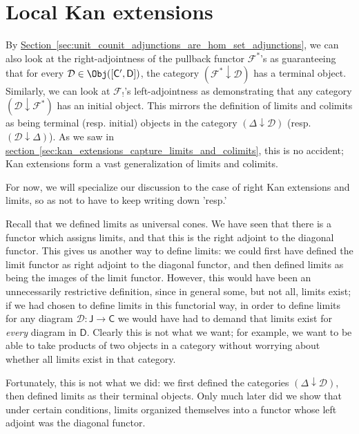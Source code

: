 \documentclass[main.tex]{subfiles}
\begin{document}
\section{Local Kan extensions}
\label{sec:local_kan_extensions}

By \hyperref[sec:unit_counit_adjunctions_are_hom_set_adjunctions]{Section~\ref*{sec:unit_counit_adjunctions_are_hom_set_adjunctions}}, we can also look at the right-adjointness of the pullback functor $\mathcal{F}^{*}$'s as guaranteeing that for every $\mathcal{D} \in \Obj([\mathsf{C}', \mathsf{D}])$, the category $(\mathcal{F}^{*} \downarrow \mathcal{D})$ has a terminal object. Similarly, we can look at $\mathcal{F}_{!}$'s left-adjointness as demonstrating that any category $(\mathcal{D} \downarrow \mathcal{F}^{*})$ has an initial object. This mirrors the definition of limits and colimits as being terminal (resp. initial) objects in the category $(\Delta \downarrow \mathcal{D})$ (resp. $(\mathcal{D} \downarrow \Delta)$). As we saw in \hyperref[sec:kan_extensions_capture_limits_and_colimits]{section~\ref*{sec:kan_extensions_capture_limits_and_colimits}}, this is no accident; Kan extensions form a vast generalization of limits and colimits.

For now, we will specialize our discussion to the case of right Kan extensions and limits, so as not to have to keep writing down 'resp.'

Recall that we defined limits as universal cones. We have seen that there is a functor which assigns limits, and that this is the right adjoint to the diagonal functor. This gives us another way to define limits: we could first have defined the limit functor as right adjoint to the diagonal functor, and then defined limits as being the images of the limit functor. However, this would have been an unnecessarily restrictive definition, since in general some, but not all, limits exist; if we had chosen to define limits in this functorial way, in order to define limits for any diagram $\mathcal{D}\colon \mathsf{J} \to \mathsf{C}$ we would have had to demand that limits exist for \emph{every} diagram in $\mathsf{D}$. Clearly this is not what we want; for example, we want to be able to take products of two objects in a category without worrying about whether all limits exist in that category.

Fortunately, this is not what we did: we first defined the categories $(\Delta \downarrow \mathcal{D})$, then defined limits as their terminal objects. Only much later did we show that under certain conditions, limits organized themselves into a functor whose left adjoint was the diagonal functor.
\end{document}
